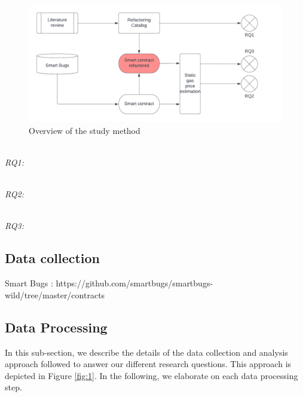 \begin{figure}[th]
\begin{center}
   \includegraphics[scale=0.45]{figure/Impact of Code Refactoring on Gas Price.png}
   \caption{\label{fig:1}Overview of the study method}
\label{test_extraction}
\end{center}
\end{figure}

\label{sec:Analysis Methodology}


 \emph{\\RQ1:\RQOne}
 
 

 \emph{\\RQ2:\RQTwo}
 


 \emph{\\RQ3:\RQThree}
 

 

\subsection{Data collection}
\label{sec:Data collection}

Smart Bugs : https://github.com/smartbugs/smartbugs-wild/tree/master/contracts








\subsection{Data Processing}
\label{sec:Data Processing}
In this sub-section, we describe the details of the data collection and analysis approach followed to answer our different research questions. This approach is depicted in Figure \ref{fig:1}. In the following, we elaborate on each data processing step.



